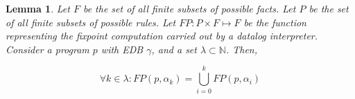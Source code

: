 \newtheorem{lemma}{Lemma} 

\begin{lemma}
%
Let $F$ be the set of all finite subsets of possible facts.   Let $P$ be the set of all finite subsets of possible rules.
Let $FP : P \times F \mapsto F$ be the function representing the
\emph{fixpoint} computation carried out by a datalog interpreter.  Consider
a program $p$ with EDB $\gamma$, and a set $\lambda \subset \mathbb{N}$.  Then,

\begin{equation}
\forall k \in \lambda : FP(p, \alpha_{k}) =  \displaystyle \bigcup_{i=0}^{k} FP(p, \alpha_{i})
\end{equation}


\end{lemma}


